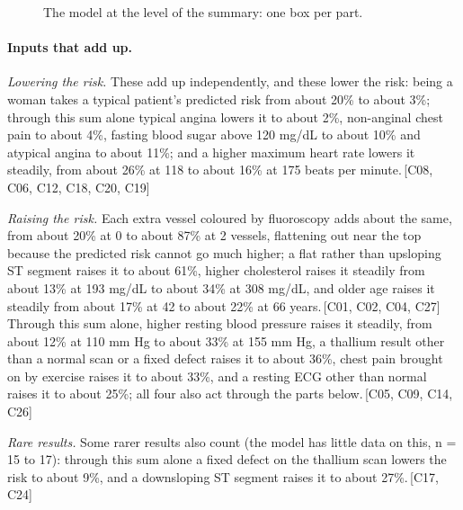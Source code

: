 \documentclass[a4paper,10pt]{article}
\newif\ifreviewmarks
\newcommand{\reviewrule}{\noindent{\color{BrickRed}\rule{\linewidth}{0.8pt}}}
\newenvironment{drafted}[1][]{%
  \ifreviewmarks\par\addvspace{\medskipamount}\reviewrule\par\nopagebreak
  \noindent{\color{BrickRed}\sffamily\footnotesize\textbf{Thesis Draft}\quad #1\hfill review}\par\nopagebreak\smallskip\fi}{%
  \ifreviewmarks\par\smallskip\noindent{\color{BrickRed}\sffamily\footnotesize end of thesis draft}\par\nopagebreak\reviewrule\par\medskip\fi}
\begin{document}
\begin{drafted}[plain-language layer: heart-s5-c2]
\begin{figure}[H]
{{}}%
\caption{The model at the level of the summary: one box per part.}
\label{fig:hearts5c2:summary}
\end{figure}
\paragraph{Inputs that add up.} \par\noindent\textit{Lowering the risk.}  These add up independently, and these lower the risk: being a woman takes a typical patient's predicted risk from about 20\% to about 3\%; through this sum alone typical angina lowers it to about 2\%, non-anginal chest pain to about 4\%, fasting blood sugar above 120 mg/dL to about 10\% and atypical angina to about 11\%; and a higher maximum heart rate lowers it steadily, from about 26\% at 118 to about 16\% at 175 beats per minute.\,{\scriptsize\textcolor{NavyBlue}{[C08, C06, C12, C18, C20, C19]}} \par\noindent\textit{Raising the risk.}  Each extra vessel coloured by fluoroscopy adds about the same, from about 20\% at 0 to about 87\% at 2 vessels, flattening out near the top because the predicted risk cannot go much higher; a flat rather than upsloping ST segment raises it to about 61\%, higher cholesterol raises it steadily from about 13\% at 193 mg/dL to about 34\% at 308 mg/dL, and older age raises it steadily from about 17\% at 42 to about 22\% at 66 years.\,{\scriptsize\textcolor{NavyBlue}{[C01, C02, C04, C27]}} Through this sum alone, higher resting blood pressure raises it steadily, from about 12\% at 110 mm Hg to about 33\% at 155 mm Hg, a thallium result other than a normal scan or a fixed defect raises it to about 36\%, chest pain brought on by exercise raises it to about 33\%, and a resting ECG other than normal raises it to about 25\%; all four also act through the parts below.\,{\scriptsize\textcolor{NavyBlue}{[C05, C09, C14, C26]}} \par\noindent\textit{Rare results.}  Some rarer results also count (the model has little data on this, n = 15 to 17): through this sum alone a fixed defect on the thallium scan lowers the risk to about 9\%, and a downsloping ST segment raises it to about 27\%.\,{\scriptsize\textcolor{NavyBlue}{[C17, C24]}}

\end{drafted}
\end{document}
